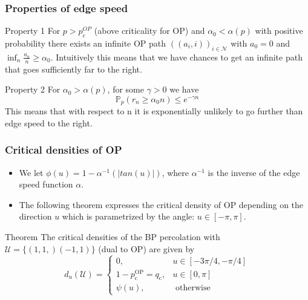 \begin{frame}
	\frametitle{Properties of edge speed}
	\begin{block}{Property 1}
		For $p > p_{c}^{OP}$ (above criticality for OP) and $\alpha_{0} < \alpha(p)$ with positive probability there exists an infinite OP path $((a_{i}, i))_{i \in \mathcal{N}}$ with $a_{0} = 0$ and $\inf_{n} \frac{a_{n}}{n} \geq \alpha_{0}$. Intuitively this means that we have chances to get an infinite path that goes sufficiently far to the right.
	\end{block}

	\begin{block}{Property 2}
		For $\alpha_{0} > \alpha(p)$, for some $\gamma > 0$ we have 
		$$
			\mathbb{P}_{p}(r_{n} \geq \alpha_{0} n) \leq e^{-\gamma n}
		$$
		This means that with respect to n it is exponentially unlikely to go further than edge speed to the right.	
	\end{block}
\end{frame}

\begin{frame}
	\frametitle{Critical densities of OP}
	\begin{itemize}
		\item We let $\phi (u) = 1 - \alpha^{-1}(|tan(u)|)$, where $\alpha^{-1}$ is the inverse of the edge speed function $\alpha$.
		\item The following theorem expresses the critical density of OP depending on the direction $u$ which is parametrized by the angle: $u \in [- \pi, \pi]$.
	\end{itemize}
	\begin{block}{Theorem}
		The critical densities of the BP percolation with $\mathcal{U} = \{(1, 1,) (-1, 1)\}$ (dual to OP) are given by
		\begin{equation}
			d_{u}(\mathcal{U})= \begin{cases}0, & u \in[-3 \pi / 4,-\pi / 4] \\ 1-p_{\mathrm{c}}^{\mathrm{OP}}=q_{\mathrm{c}}, & u \in[0, \pi] \\ \psi(u), & \text { otherwise }\end{cases}
		\end{equation}
	\end{block}
\end{frame}

